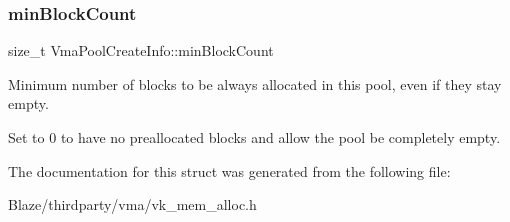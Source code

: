 \subsubsection{\texorpdfstring{min\+Block\+Count}{minBlockCount}}
{\footnotesize\ttfamily size\+\_\+t Vma\+Pool\+Create\+Info\+::min\+Block\+Count}



Minimum number of blocks to be always allocated in this pool, even if they stay empty. 

Set to 0 to have no preallocated blocks and allow the pool be completely empty. 

The documentation for this struct was generated from the following file\+:\begin{DoxyCompactItemize}
\item 
Blaze/thirdparty/vma/vk\+\_\+mem\+\_\+alloc.\+h\end{DoxyCompactItemize}

